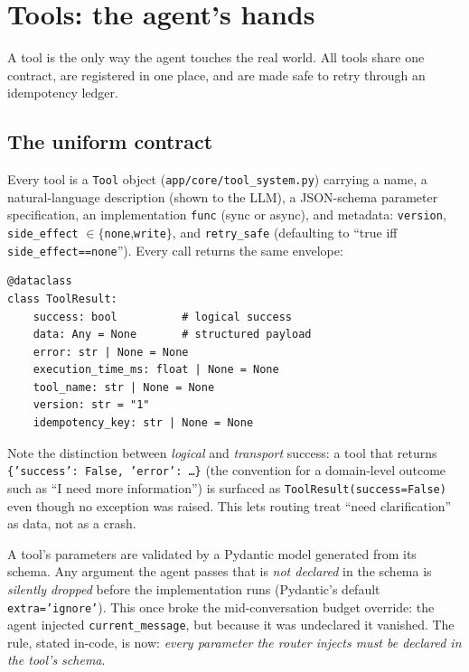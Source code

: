 \documentclass[11pt,a4paper]{article}
\newcommand{\code}[1]{\texttt{\small #1}}
\begin{document}
\section{Tools: the agent's hands}
\label{sec:tools}

A tool is the only way the agent touches the real world. All tools share one
contract, are registered in one place, and are made safe to retry through an
idempotency ledger.

\subsection{The uniform contract}
Every tool is a \code{Tool} object (\code{app/core/tool\_system.py}) carrying a name,
a natural-language description (shown to the LLM), a JSON-schema parameter
specification, an implementation \code{func} (sync or async), and metadata:
\code{version}, \code{side\_effect} $\in\{$\code{none},\code{write}$\}$, and
\code{retry\_safe} (defaulting to ``true iff \code{side\_effect==none}''). Every call
returns the same envelope:

\begin{lstlisting}
@dataclass
class ToolResult:
    success: bool          # logical success
    data: Any = None       # structured payload
    error: str | None = None
    execution_time_ms: float | None = None
    tool_name: str | None = None
    version: str = "1"
    idempotency_key: str | None = None
\end{lstlisting}

Note the distinction between \emph{logical} and \emph{transport} success: a tool that
returns \code{\{'success': False, 'error': \dots\}} (the convention for a
domain-level outcome such as ``I need more information'') is surfaced as
\code{ToolResult(success=False)} even though no exception was raised. This lets
routing treat ``need clarification'' as data, not as a crash.

\begin{keybox}[The \code{extra='ignore'} pitfall]
A tool's parameters are validated by a Pydantic model generated from its schema. Any
argument the agent passes that is \emph{not declared} in the schema is
\emph{silently dropped} before the implementation runs (Pydantic's default
\code{extra='ignore'}). This once broke the mid-conversation budget override: the
agent injected \code{current\_message}, but because it was undeclared it vanished. The
rule, stated in-code, is now: \emph{every parameter the router injects must be
declared in the tool's schema}.
\end{keybox}
\end{document}
